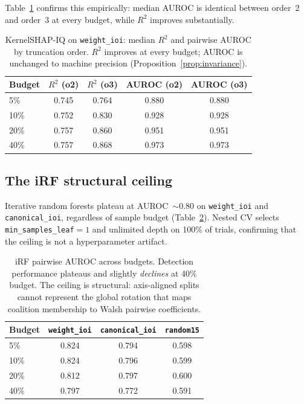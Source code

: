 \documentclass[11pt]{article}
\begin{document}
Table~\ref{tab:order-effect} confirms this empirically: median
AUROC is identical between order~2 and order~3 at every budget,
while $R^2$ improves substantially.

\begin{table}[t]
\centering
\caption{KernelSHAP-IQ on \texttt{weight\_ioi}: median $R^2$ and
pairwise AUROC by truncation order. $R^2$ improves at every budget;
AUROC is unchanged to machine precision
(Proposition~\ref{prop:invariance}).}
\label{tab:order-effect}
\begin{tabular}{lcccc}
\toprule
Budget & $R^2$ (o2) & $R^2$ (o3) & AUROC (o2) & AUROC (o3) \\
\midrule
5\%  & 0.745 & 0.764 & 0.880 & 0.880 \\
10\% & 0.752 & 0.830 & 0.928 & 0.928 \\
20\% & 0.757 & 0.860 & 0.951 & 0.951 \\
40\% & 0.757 & 0.868 & 0.973 & 0.973 \\
\bottomrule
\end{tabular}
\end{table}


\subsection{The iRF structural ceiling}
\label{sec:irf-ceiling}

Iterative random forests plateau at AUROC~$\sim 0.80$ on
\texttt{weight\_ioi} and \texttt{canonical\_ioi}, regardless of
sample budget (Table~\ref{tab:irf-ceiling}). Nested CV selects
\texttt{min\_samples\_leaf}$=1$ and unlimited depth on 100\% of
trials, confirming that the ceiling is not a hyperparameter artifact.

\begin{table}[t]
\centering
\caption{iRF pairwise AUROC across budgets. Detection performance
plateaus and slightly \emph{declines} at 40\% budget. The ceiling
is structural: axis-aligned splits cannot represent the global
rotation that maps coalition membership to Walsh pairwise coefficients.}
\label{tab:irf-ceiling}
\begin{tabular}{lccc}
\toprule
Budget & \texttt{weight\_ioi} & \texttt{canonical\_ioi} & \texttt{random15} \\
\midrule
5\%  & 0.824 & 0.794 & 0.598 \\
10\% & 0.824 & 0.796 & 0.599 \\
20\% & 0.812 & 0.797 & 0.600 \\
40\% & 0.797 & 0.772 & 0.591 \\
\bottomrule
\end{tabular}
\end{table}
\end{document}
